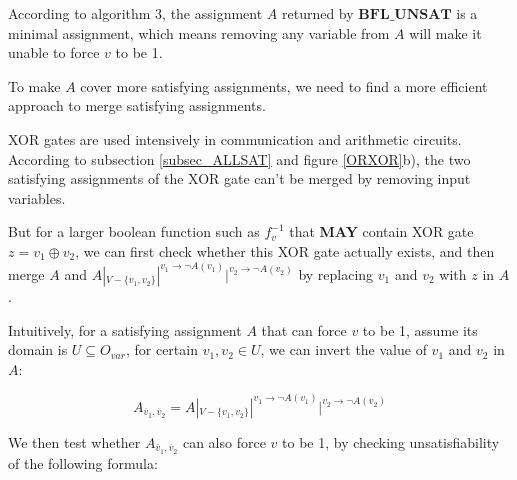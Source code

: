 \documentclass[journal]{IEEEtran}
\begin{document}


According to algorithm 3,
the assignment $A$ returned by $\boldsymbol{BFL\_UNSAT}$ is a minimal assignment,
which means
removing any variable from $A$ will make it unable to force $v$ to be 1.

To make $A$ cover more satisfying assignments,
we need to find a more efficient approach to merge satisfying assignments.

XOR gates are used intensively in communication and arithmetic circuits.
According to subsection \ref{subsec_ALLSAT} and figure \ref{ORXOR}b),
the two satisfying assignments of the XOR gate can't be merged by removing input variables.

But for a larger boolean function such as $f^{-1}_v$ that \textbf{MAY} contain XOR gate $z=v_1 \oplus v_2$,
we can first check whether this XOR gate actually exists,
and then merge $A$ and $A|_{V-\{v_1,v_2\}}|^{v_1\to \neg A(v_1)}|^{v_2\to \neg A(v_2)}$ by replacing $v_1$ and $v_2$ with $z$ in $A$.

Intuitively,
for a satisfying assignment $A$ that can force $v$ to be 1,
assume its domain is $U\subseteq O_{var}$,
for certain $v_1,v_2\in U$,
we can invert the value of $v_1$ and $v_2$ in $A$:

\begin{equation}
A_{\overline{v}_1,\overline{v}_2}=A|_{V-\{v_1,v_2\}}|^{v_1\to \neg A(v_1)}|^{v_2\to \neg A(v_2)}
\end{equation}

We then test whether $A_{\overline{v}_1,\overline{v}_2}$ can also force $v$ to be 1,
by checking unsatisfiability of the following formula:
\end{document}
